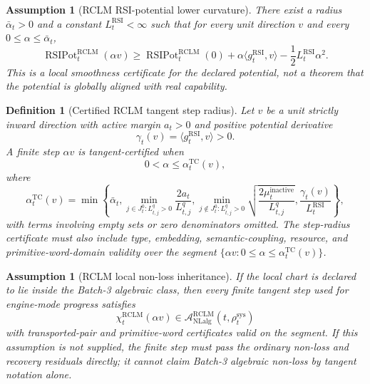 \documentclass[11pt,a4paper]{article}
\newtheorem{definition}[theorem]{Definition}
\newtheorem{assumption}[theorem]{Assumption}
\newcommand{\Acal}{\mathcal A}
\newcommand{\RCLM}{\mathrm{RCLM}}
\newcommand{\RSI}{\mathrm{RSI}}
\newcommand{\sys}{\mathrm{sys}}
\newcommand{\NLalg}{\mathrm{NLalg}}
\newcommand{\TC}{\mathrm{TC}}
\newcommand{\RSIPot}{\operatorname{RSIPot}}
\begin{document}
\begin{assumption}[RCLM RSI-potential lower curvature]
\label{ass:rclm-rsi-potential-lower-curvature}
There exist a radius \(\bar\alpha_t>0\) and a constant \(L_t^{\RSI}<\infty\) such that for every unit direction \(v\) and every \(0\le\alpha\le\bar\alpha_t\),
\[
\RSIPot_t^{\RCLM}(\alpha v)
\ge
\RSIPot_t^{\RCLM}(0)
+\alpha\langle g_t^{\RSI},v\rangle
-\frac12L_t^{\RSI}\alpha^2.
\]
This is a local smoothness certificate for the declared potential, not a theorem that the potential is globally aligned with real capability.
\end{assumption}

\begin{definition}[Certified RCLM tangent step radius]
\label{def:rclm-certified-tangent-step-radius}
Let \(v\) be a unit strictly inward direction with active margin \(a_t>0\) and positive potential derivative
\[
\gamma_t(v)=\langle g_t^{\RSI},v\rangle>0.
\]
A finite step \(\alpha v\) is tangent-certified when
\[
0<\alpha\le \alpha_t^{\TC}(v),
\]
where
\[
\alpha_t^{\TC}(v)
=
\min\left\{
\bar\alpha_t,
\min_{j\in J_t^0:L_{t,j}^{q}>0}\frac{2a_t}{L_{t,j}^{q}},
\min_{j\notin J_t^0:L_{t,j}^{q}>0}\sqrt{\frac{2\mu_t^{\mathrm{inactive}}}{L_{t,j}^{q}}},
\frac{\gamma_t(v)}{L_t^{\RSI}}
\right\},
\]
with terms involving empty sets or zero denominators omitted.  The step-radius certificate must also include type, embedding, semantic-coupling, resource, and primitive-word-domain validity over the segment \(\{\alpha v:0\le\alpha\le\alpha_t^{\TC}(v)\}\).
\end{definition}

\begin{assumption}[RCLM local non-loss inheritance]
\label{ass:rclm-local-nonloss-inheritance}
If the local chart is declared to lie inside the Batch-3 algebraic class, then every finite tangent step used for engine-mode progress satisfies
\[
\chi_t^{\RCLM}(\alpha v)\in\Acal_{\NLalg}^{\RCLM}(t,\rho_t^{\sys})
\]
with transported-pair and primitive-word certificates valid on the segment.  If this assumption is not supplied, the finite step must pass the ordinary non-loss and recovery residuals directly; it cannot claim Batch-3 algebraic non-loss by tangent notation alone.
\end{assumption}
\end{document}
